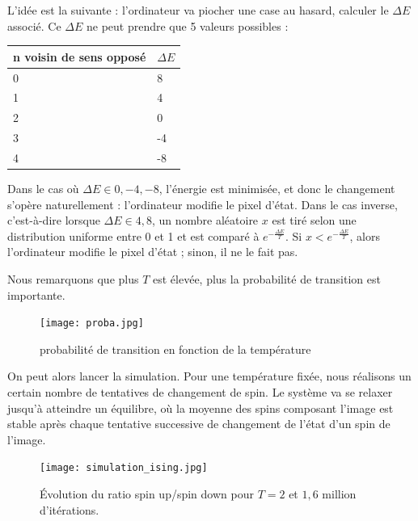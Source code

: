 \documentclass[11pt, parskip=half]{scrartcl} %
\begin{document}
L'idée est la suivante : l'ordinateur va piocher une case au hasard, calculer le $\Delta E$ associé. Ce $\Delta E$ ne peut prendre que 5 valeurs possibles : 

\begin{center}
	\begin{tabular}{|l|m{4cm}|}
		\hline
		n voisin de sens opposé & $\Delta E $ \\
		\hline
		0                       & 8           \\
		1                       & 4           \\
		2                       & 0           \\
		3                       & -4          \\
		4                       & -8          \\\hline
	\end{tabular}
\end{center}

\vspace{4mm}

Dans le cas où $\Delta E \in {0, -4, -8}$, l'énergie est minimisée, et donc le changement s'opère naturellement : l'ordinateur modifie le pixel d'état. Dans le cas inverse, c'est-à-dire lorsque $\Delta E \in {4, 8}$, un nombre aléatoire $x$ est tiré selon une distribution uniforme entre 0 et 1 et est comparé à $e^{-\frac{\Delta E}{T}}$. Si $x < e^{-\frac{\Delta E}{T}}$, alors l'ordinateur modifie le pixel d'état ; sinon, il ne le fait pas.

Nous remarquons que plus $T$ est élevée, plus la probabilité de transition est importante.

\begin{figure}[h]
	\centering
	\texttt{[image: proba.jpg]}
	\caption{probabilité de transition en fonction de la température}
	\label{fig:H}
\end{figure}

On peut alors lancer la simulation. Pour une température fixée, nous réalisons un certain nombre de tentatives de changement de spin. Le système va se relaxer jusqu'à atteindre un équilibre, où la moyenne des spins composant l'image est stable après chaque tentative successive de changement de l'état d'un spin de l'image.

\begin{figure}[h]
\centering
\texttt{[image: simulation\_ising.jpg]}
\caption{Évolution du ratio spin up/spin down pour $T=2$ et $1,6$ million d'itérations.}
\label{fig:H}
\end{figure}
\end{document}
